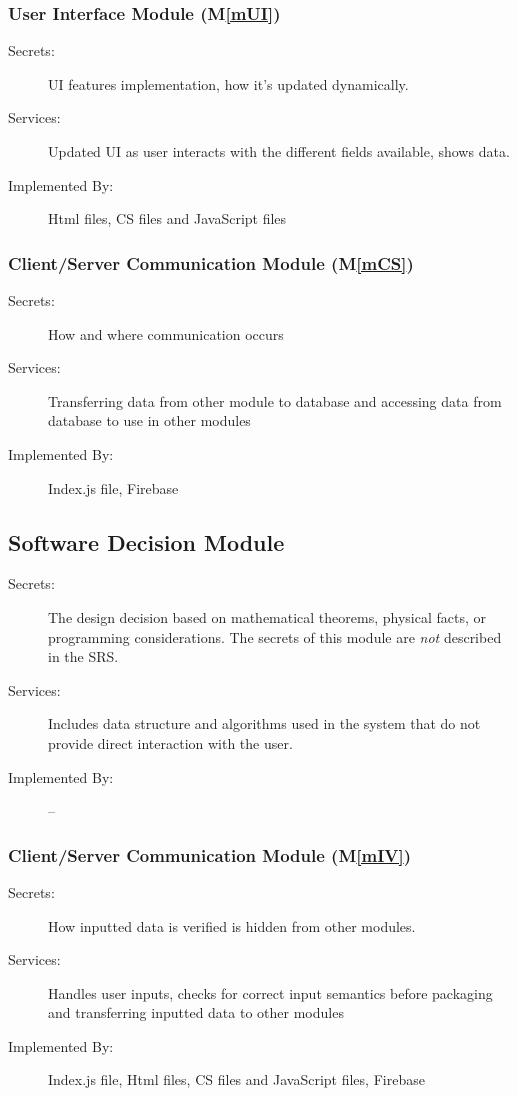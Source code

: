 \documentclass[12pt, titlepage]{article}
\newcommand{\mref}[1]{M\ref{#1}}
\begin{document}
\subsubsection{User Interface Module (\mref{mUI})}
\begin{description}
\item[Secrets:]UI features implementation, how it's updated dynamically.
\item[Services:]Updated UI as user interacts with the different fields available, shows data.
\item[Implemented By:]Html files, CS files and JavaScript files
\end{description}


\subsubsection{Client/Server Communication Module (\mref{mCS})}
\begin{description}
\item[Secrets:]How and where communication occurs
\item[Services:]Transferring data from other module to database and accessing data from database to use in other modules
\item[Implemented By:]Index.js file, Firebase
\end{description}






\subsection{Software Decision Module}

\begin{description}
\item[Secrets:] The design decision based on mathematical theorems, physical
  facts, or programming considerations. The secrets of this module are
  \emph{not} described in the SRS.
\item[Services:] Includes data structure and algorithms used in the system that
  do not provide direct interaction with the user. 
\item[Implemented By:] --
\end{description}

\subsubsection{Client/Server Communication Module (\mref{mIV})}
\begin{description}
\item[Secrets:]How inputted data is verified is hidden from other modules.
\item[Services:]Handles user inputs, checks for correct input semantics before packaging and transferring inputted data to other modules
\item[Implemented By:]Index.js file, Html files, CS files and JavaScript files, Firebase
\end{description}
\end{document}
